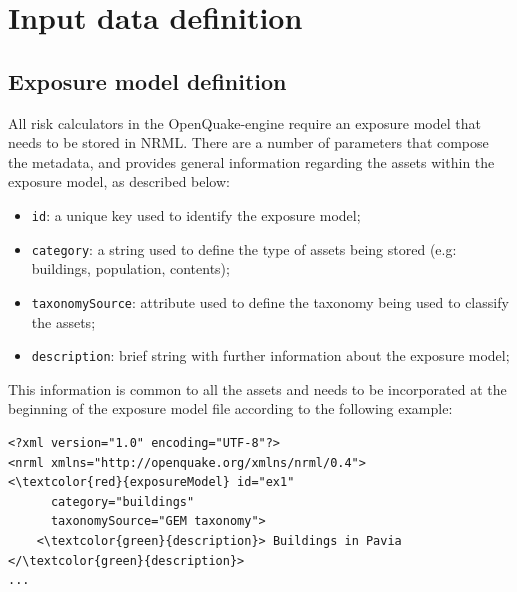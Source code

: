 \section{Input data definition}
\subsection{Exposure model definition}
All risk calculators in the OpenQuake-engine require an \gls{exposure model} that needs to be stored in NRML. There are a number of parameters that compose the metadata, and provides general information regarding the \glspl{asset} within the \gls{exposure model}, as described below:

\begin{itemize}
\item  \Verb+id+: a unique key used to identify the \gls{exposure model};
\item  \Verb+category+: a string used to define the type of \glspl{asset} being stored (e.g: buildings, population, contents);
\item  \Verb+taxonomySource+: attribute used to define the \gls{taxonomy} being used to classify the  \glspl{asset};
\item  \Verb+description+: brief string with further information about the \gls{exposure model};
\end{itemize}

This information is common to all the assets and needs to be incorporated at the beginning of the exposure model file according to the following example:

\begin{Verbatim}[frame=single, commandchars=\\\{\}, samepage=false]
<?xml version="1.0" encoding="UTF-8"?>
<nrml xmlns="http://openquake.org/xmlns/nrml/0.4">
<\textcolor{red}{exposureModel} id="ex1"
      category="buildings"
      taxonomySource="GEM taxonomy">
    <\textcolor{green}{description}> Buildings in Pavia </\textcolor{green}{description}>
...
\end{Verbatim}

